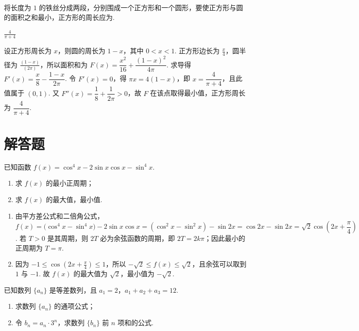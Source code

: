 \begin{problem}
将长度为 \(1\) 的铁丝分成两段，分别围成一个正方形和一个圆形，要使正方形与圆的面积之和最小，正方形的周长应为\fillinblank{}.
\end{problem}

\begin{answer}
\(\frac{4}{\pi+4}\)
\end{answer}

\begin{solution}
设正方形周长为 \(x\)，则圆的周长为 \(1-x\)，其中 \(0<x<1\). 正方形边长为 \(\frac{x}{4}\)，圆半径为 \(\frac{(1-x)}{(2\pi)}\)，所以面积和为
\(F(x)=\dfrac{x^2}{16}+\dfrac{(1-x)^2}{4\pi}\). 求导得
\(F'(x)=\dfrac{x}{8}-\dfrac{1-x}{2\pi}\). 令 \(F'(x)=0\)，得 \(\pi x=4(1-x)\)，即 \(x=\dfrac{4}{\pi+4}\)，且此值属于 \((0,1)\). 又
\(F''(x)=\dfrac18+\dfrac{1}{2\pi}>0\)，故 \(F\) 在该点取得最小值，正方形周长为 \(\dfrac{4}{\pi+4}\).
\end{solution}

\section{解答题}
\begin{problem}
已知函数 \(f(x) = \cos^4 x - 2 \sin x \cos x - \sin^4 x\).

\begin{enumerate}
\item 求 \(f(x)\) 的最小正周期；
\item 求 \(f(x)\) 的最大值，最小值.
\end{enumerate}
\end{problem}

\begin{solution}
\begin{enumerate}
\item 由平方差公式和二倍角公式，
\(f(x)=\bigl(\cos^4x-\sin^4x\bigr)-2\sin x\cos x=(\cos^2x-\sin^2x)-\sin2x=\cos2x-\sin2x=\sqrt2\cos\left(2x+\dfrac\pi4\right)\). 若 \(T>0\) 是其周期，则 \(2T\) 必为余弦函数的周期，即 \(2T=2k\pi\)；因此最小的正周期为 \(T=\pi\).
\item 因为 \(-1\leqslant\cos(2x+\frac{\pi}{4})\leqslant1\)，所以 \(-\sqrt2\leqslant f(x)\leqslant\sqrt2\)，且余弦可以取到 \(1\) 与 \(-1\). 故 \(f(x)\) 的最大值为 \(\sqrt2\)，最小值为 \(-\sqrt2\).
\end{enumerate}
\end{solution}

\begin{problem}
已知数列 \(\{a_n\}\) 是等差数列，且 \(a_1 = 2\)，\(a_1 + a_2 + a_3 = 12\).

\begin{enumerate}
\item 求数列 \(\{a_n\}\) 的通项公式；
\item 令 \(b_n = a_n \cdot 3^n\)，求数列 \(\{b_n\}\) 前 \(n\) 项和的公式.
\end{enumerate}
\end{problem}

